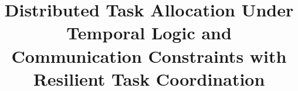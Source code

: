 \documentclass[lettersize,journal]{IEEEtran}
\begin{document}
\title{Distributed Task Allocation Under Temporal Logic and Communication Constraints with Resilient Task Coordination}




\maketitle
\end{document}
